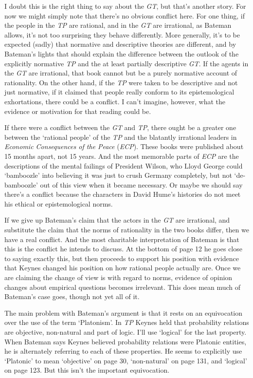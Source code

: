 \noindent I doubt this is the right thing to say about the \textit{GT}, but that's another story. For now we might simply note that there's no obvious conflict here. For one thing, if the people in the \textit{TP} are rational, and in the \textit{GT} are irrational, as Bateman allows, it's not too surprising they behave differently. More generally, it's to be expected (sadly) that normative and descriptive theories are different, and by Bateman's lights that should explain the difference between the outlook of the explicitly normative \textit{TP} and the at least partially descriptive \textit{GT}. If the agents in the \textit{GT} are irrational, that book cannot but be a purely normative account of rationality. On the other hand, if the \textit{TP} were taken to be descriptive and not just normative, if it claimed that people really conform to its epistemological exhortations, there could be a conflict. I can't imagine, however, what the evidence or motivation for that reading could be.

If there were a conflict between the \textit{GT} and \textit{TP}, there ought be a greater one between the `rational people' of the \textit{TP} and the blatantly irrational leaders in \textit{Economic Consequences of the Peace} (\textit{ECP}). These books were published about 15 months apart, not 15 years. And the most memorable parts of \textit{ECP} are the descriptions of the mental failings of President Wilson, who Lloyd George could `bamboozle' into believing it was just to crush Germany completely, but not `de-bamboozle' out of this view when it became necessary. Or maybe we should say there's a conflict because the characters in David Hume's histories do not meet his ethical or epistemological norms.

If we give up Bateman's claim that the actors in the \textit{GT} are irrational, and substitute the claim that the norms of rationality in the two books differ, then we have a real conflict. And the most charitable interpretation of Bateman is that this is the conflict he intends to discuss. At the bottom of page 12 he goes close to saying exactly this, but then proceeds to support his position with evidence that Keynes changed his position on how rational people actually are. Once we are claiming the change of view is with regard to norms, evidence of opinion changes about empirical questions becomes irrelevant. This does mean much of Bateman's case goes, though not yet all of it.

The main problem with Bateman's argument is that it rests on an equivocation over the use of the term `Platonism'. In \textit{TP} Keynes held that probability relations are objective, non-natural and part of logic. I'll use `logical' for the last property. When Bateman says Keynes believed probability relations were Platonic entities, he is alternately referring to each of these properties. He seems to explicitly use `Platonic' to mean `objective' on page 30, `non-natural' on page 131, and `logical' on page 123. But this isn't the important equivocation.

